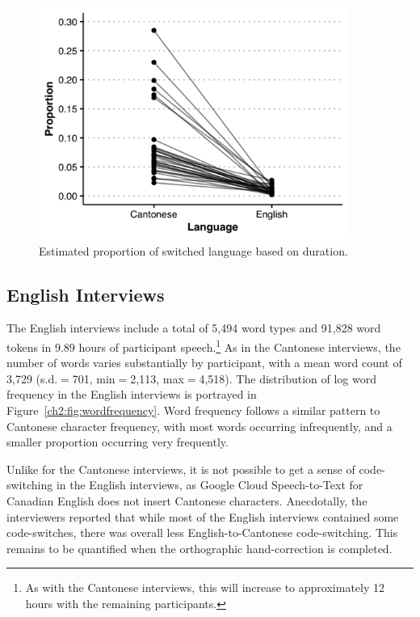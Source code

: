 \begin{figure}[!htbp]
  \begin{center}
  \includegraphics[width=4in]{figures/ch2_switchfrequency_4in.png} 
  \caption{Estimated proportion of switched language based on duration.}
  \label{ch2:fig:codeswitch}
  \end{center}
\end{figure}

\subsection{English Interviews}\label{ch2:subsec:english_descriptive}
The English interviews include a total of 5,494 word types and 91,828 word tokens in 9.89 hours of participant speech.\footnote{As with the Cantonese interviews, this will increase to approximately 12 hours with the remaining participants.} As in the Cantonese interviews, the number of words varies substantially by participant, with a mean word count of 3,729 (s.d.$=$701, min$=$2,113, max$=$4,518). The distribution of log word frequency in the English interviews is portrayed in Figure~\ref{ch2:fig:wordfrequency}. Word frequency follows a similar pattern to Cantonese character frequency, with most words occurring infrequently, and a smaller proportion occurring very frequently.

Unlike for the Cantonese interviews, it is not possible to get a sense of code-switching in the English interviews, as Google Cloud Speech-to-Text for Canadian English does not insert Cantonese characters. Anecdotally, the interviewers reported that while most of the English interviews contained some code-switches, there was overall less English-to-Cantonese code-switching. This remains to be quantified when the orthographic hand-correction is completed.

